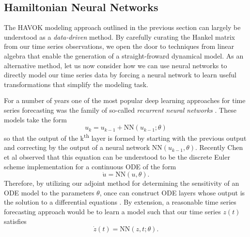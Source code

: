 \subsection{Hamiltonian Neural Networks}

The HAVOK modeling approach outlined in the previous section can largely be understood as a \textit{data-driven} method. By carefully curating the Hankel matrix from our time series observations, we open the door to techniques from linear algebra that enable the generation of a straight-froward dynamical model. As an alternative method, let us now consider how we can use neural networks to directly model our time series data by forcing a neural network to learn useful transformations that simplify the modeling task.

For a number of years one of the most popular deep learning approaches for time series forecasting was the family of so-called \textit{recurrent neural networks} \cite{time-series-rnns}. These models take the form
\begin{equation}
  u_k = u_{k-1} + \text{NN}(u_{k-1};\theta)
\end{equation}
so that the output of the k\textsuperscript{th} layer is formed by starting with the previous output and correcting by the output of a neural network $\text{NN}(u_{k-1},\theta)$. Recently Chen et al observed that this equation can be understood to be the discrete Euler scheme implementation for a continuous ODE of the form
\begin{equation}
  \dot{u} = \text{NN}(u, \theta).
\end{equation}
Therefore, by utilizing our adjoint method for determining the sensitivity of an ODE model to the parameters $\theta$, once can construct ODE layers whose output is the solution to a differential equations \cite{neural-odes}. By extension, a reasonable time series forecasting approach would be to learn a model such that our time series $z(t)$ satisfies
\begin{equation}
  \dot{z}(t) = \text{NN}(z, t; \theta).
\end{equation}

